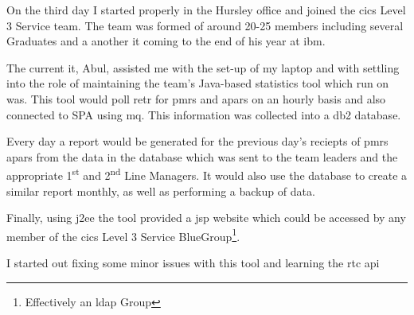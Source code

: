 \documentclass[a4paper,11pt]{report}
\begin{document}
On the third day I started properly in the Hursley office and joined the \gls{cics} Level 3 Service
team. The team was formed of around 20-25 members including several Graduates and a another 
\gls{it} coming to the end of his year at \gls{ibm}.

The current \gls{it}, Abul, assisted me with the set-up of my laptop and with settling into the 
role of maintaining the team's Java-based statistics tool which run on \gls{was}. This tool would 
poll \gls{retr} for \gls{pmr}s and \gls{apar}s on an hourly basis and also connected to SPA using 
\gls{mq}. This information was collected into a \gls{db2} database.

Every day a report would be generated for the previous day's reciepts of \gls{pmr}s \gls{apar}s 
from the data in the database which was sent to the team leaders and the appropriate 
1\textsuperscript{st} and 2\textsuperscript{nd} Line Managers. It would also use the database to
create a similar report monthly, as well as performing a backup of data.

Finally, using \gls{j2ee} the tool provided a \gls{jsp} website which could be accessed by any 
member of the \gls{cics} Level 3 Service BlueGroup\footnote{Effectively an \gls{ldap} Group}.

I started out fixing some minor issues with this tool and learning the \gls{rtc} \gls{api}
\end{document}
